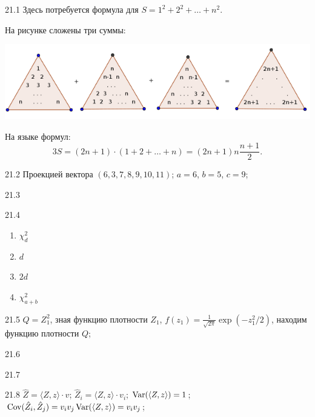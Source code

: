 \begin{solution}{{21.1}}
Здесь потребуется формула для $S=1^2+2^2 + \ldots + n^2$.

На рисунке сложены три суммы:

\begin{minipage}{0.8\textwidth}
\includegraphics[width=\textwidth]{figure/triangle-proof.png}
\end{minipage}

На языке формул:
\[
  3S = (2n+1) \cdot (1 + 2 + \ldots + n) = (2n+1)n\frac{n+1}{2}.
\]
\end{solution}
\protect \hypertarget {soln:21.2}{}
\begin{solution}{{21.2}}
  Проекцией вектора $(6, 3, 7, 8, 9, 10, 11)$; $a=6$, $b=5$, $c= 9$;
\end{solution}
\protect \hypertarget {soln:21.3}{}
\begin{solution}{{21.3}}
\end{solution}
\protect \hypertarget {soln:21.4}{}
\begin{solution}{{21.4}}
\begin{enumerate}
\item $\chi^2_d$
\item $d$
\item $2d$
\item $\chi^2_{a+b}$
\end{enumerate}
\end{solution}
\protect \hypertarget {soln:21.5}{}
\begin{solution}{{21.5}}
  $Q= Z_1^2$, зная функцию плотности $Z_1$, $f(z_1) = \frac{1}{\sqrt{2\pi}}\exp(-z_1^2/2)$, находим функцию плотности $Q$;
\end{solution}
\protect \hypertarget {soln:21.6}{}
\begin{solution}{{21.6}}
\end{solution}
\protect \hypertarget {soln:21.7}{}
\begin{solution}{{21.7}}
\end{solution}
\protect \hypertarget {soln:21.8}{}
\begin{solution}{{21.8}}
  $\hat Z = \langle Z, z\rangle \cdot v$;
$\hat Z_i = \langle Z, z\rangle \cdot v_i$;
$\operatorname{Var}(\langle Z, z\rangle)=1$; $\operatorname{Cov}(\hat Z_i, \hat Z_j)=v_i v_j \operatorname{Var}( \langle Z, z\rangle)= v_i v_j$;
\end{solution}
